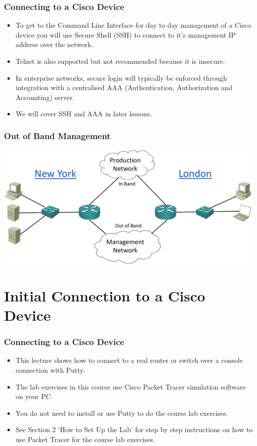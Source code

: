 \documentclass[pdflatex,compress]{beamer}
\begin{document}
\begin{frame}
	\frametitle{Connecting to a Cisco Device}
	\begin{itemize}
		\item To get to the Command Line Interface for day to day management of a Cisco device you will use Secure Shell (SSH) to connect to it’s management IP address over the network.
		\item Telnet is also supported but not recommended because it is insecure.
		\item In enterprise networks, secure login will typically be enforced through integration with a centralised AAA (Authentication, Authorization and Accounting) server.
		\item We will cover SSH and AAA in later lessons.
	\end{itemize}
\end{frame}

\begin{frame}
	\frametitle{Out of Band Management}
	\begin{center}
		\includegraphics[width=1\linewidth]{img/img02}
	\end{center}
\end{frame}

\section{Initial Connection to a Cisco Device}

\begin{frame}
	\frametitle{Connecting to a Cisco Device}
	\begin{itemize}
		\item This lecture shows how to connect to a real router or switch over a console connection with Putty.
		\item The lab exercises in this course use Cisco Packet Tracer simulation software on your PC.
		\item You do not need to install or use Putty to do the course lab exercises.
		\item See Section 2 ‘How to Set Up the Lab’ for step by step instructions on how to use Packet Tracer for the course lab exercises.
	\end{itemize}
\end{frame}
\end{document}

